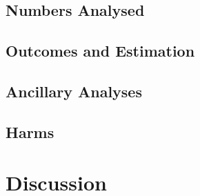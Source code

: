\documentclass[12pt]{article}
\begin{document}
\subsection{Numbers Analysed}

\subsection{Outcomes and Estimation}

\subsection{Ancillary Analyses}

\subsection{Harms}

\section{Discussion}



\end{document}
